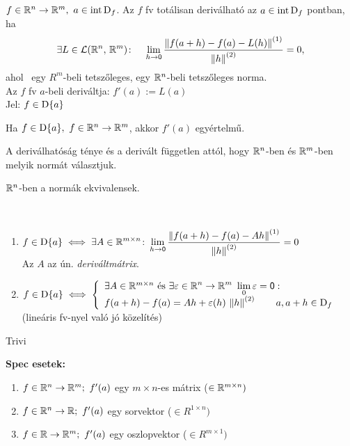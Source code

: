 \begin{de}
  $f\in\mathbb{R}^n\to\mathbb{R}^m,\ a\in\operatorname{int\,D}_f$. Az $f$ fv totálisan deriválható az $a\in\operatorname{int\,D}_f$ pontban, ha
  \[\exists L\in\mathcal{L}(\mathbb{R}^n,\,\mathbb{R}^m)\colon\quad \lim_{h\to\mathsf{0}}\dfrac{\left\Vert f(a+h)-f(a)-L(h)\right\Vert^{(1)}}{\left\Vert h\right\Vert^{(2)}} = 0,\]
  ahol \ egy $R^m$-beli tetszőleges,  egy $\mathbb{R}^n$-beli tetszőleges norma.\\
  Az $f$ fv $a$-beli deriváltja: $f'(a) := L(a)$\\
  Jel: $f\in\operatorname{D}\{a\}$
\end{de}

\begin{te}
  Ha $f\in\operatorname{D}\{a\},\ f\in\mathbb{R}^n\to\mathbb{R}^m$, akkor $f'(a)$ egyértelmű.
\end{te}

\begin{te}
  A deriválhatóság ténye és a derivált független attól, hogy $\mathbb{R}^n$-ben és $\mathbb{R}^m$-ben melyik normát választjuk.
\end{te}
\begin{biz}
  $\mathbb{R}^n$-ben a normák ekvivalensek.
\end{biz}

\begin{te}\ 
  \begin{enumerate}
    \item $\displaystyle f\in\operatorname{D}\{a\} \iff  \exists A\in\mathbb{R}^{m\times n}\colon  \lim_{h\to\mathsf{0}} \dfrac{\left\Vert f(a+h) -f(a) -Ah\right\Vert^{(1)}}{
    \left\Vert h\right\Vert^{(2)}} = 0$\\
      Az $A$ az ún. \emph{deriváltmátrix}.
    \item $f\in\operatorname{D}\{a\}  \iff \left\{\begin{array}{l}\exists A\in\mathbb{R}^{m\times n} \text{  és } \displaystyle\exists \varepsilon \in\mathbb{R}^n\to\mathbb{R}^m\
    \lim_0\varepsilon=\mathsf{0} :\\f(a+h) -f(a)= Ah + \varepsilon(h)\,\left\Vert h\right\Vert^{(2)}\qquad a,a+h\in \operatorname{D}_f\end{array}\right.$\\
      (lineáris fv-nyel való jó közelítés)
  \end{enumerate}
\end{te}
\begin{biz}Trivi\end{biz}
  

\textbf{Spec esetek:}
\begin{enumerate}
  \item $f\in\mathbb{R}^n\to\mathbb{R}^m;\ f'(a)$ egy $m\times n$-es mátrix ($\in\mathbb{R}^{m\times n})$
  \item $f\in\mathbb{R}^n\to\mathbb{R};\ f'(a)$ egy sorvektor  ($\in R^{1\times n})$
  \item $f\in\mathbb{R}\to\mathbb{R}^m;\ f'(a)$ egy oszlopvektor ($\in R^{m\times1})$   
\end{enumerate}


